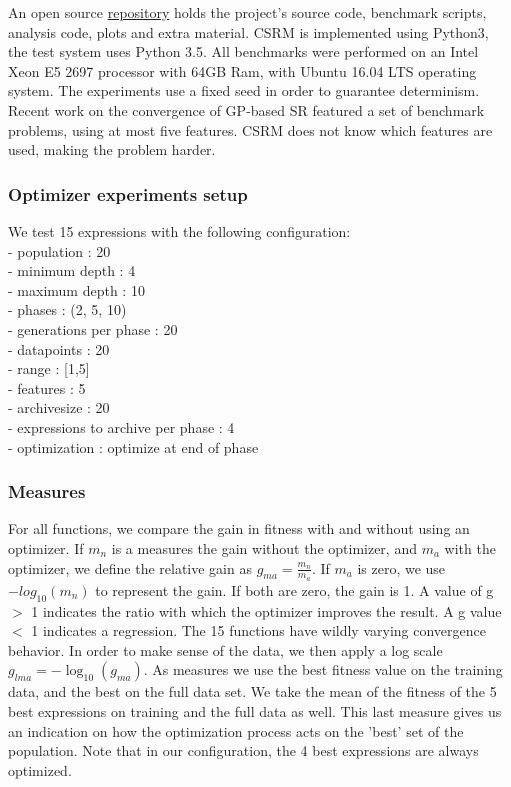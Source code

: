 An open source \href{https://bitbucket.org/bcardoen/csrm}{repository} holds the project's source code, benchmark scripts, analysis code, plots and extra material. CSRM is implemented using Python3, the test system uses Python 3.5. 
All benchmarks were performed on an Intel Xeon E5 2697 processor with 64GB Ram, with Ubuntu 16.04 LTS operating system. The experiments use a fixed seed in order to guarantee determinism. 
Recent work on the convergence of GP-based SR \cite{SRAccur, SRBaseline} featured a set of benchmark problems, using at most five features. CSRM does not know which features are used, making the problem harder. 
\subsubsection{Optimizer experiments setup}
We test 15 expressions with the following configuration: \\
- population : 20\\
- minimum depth : 4\\
- maximum depth : 10\\
- phases : (2, 5, 10)\\
- generations per phase : 20\\
- datapoints : 20\\
- range : [1,5]\\
- features : 5\\
- archivesize : 20\\
- expressions to archive per phase : 4\\
- optimization : optimize at end of phase
\subsubsection{Measures}
For all functions, we compare the gain in fitness with and without using an optimizer. 
If $m_n$ is a measures the gain without the optimizer, and $m_a$ with the optimizer, we define the relative gain as $ g_{ma} = \frac{m_n}{m_a}$. If $m_a$ is zero, we use $-log_{10}(m_n)$ to represent the gain. If both are zero, the gain is 1. A value of g $>$ 1 indicates the ratio with which the optimizer improves the result. A g value $<$ 1 indicates a regression. The 15 functions have wildly varying convergence behavior. In order to make sense of the data, we then apply a log scale $ g_{lma} = - \log_{10}(g_{ma}) $.
As measures we use the best fitness value on the training data, and the best on the full data set. We take the mean of the fitness of the 5 best expressions on training and the full data as well. This last measure gives us an indication on how the optimization process acts on the 'best' set of the population. Note that in our configuration, the 4 best expressions are always optimized.
